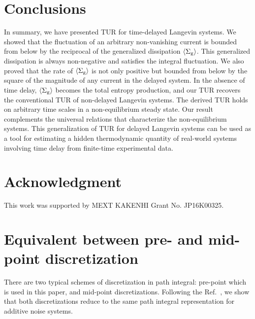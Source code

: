 \documentclass[pre,
twocolumn,
]{revtex4-1}
\theoremstyle{definition}
\theoremstyle{definition}
\newcommand{\avg}[1]{\langle #1\rangle}
\newcommand{\inl}[1]{$ #1 $}
\begin{document}
\section{Conclusions}\label{sect.Conclusion}
In summary, we have presented TUR for time-delayed Langevin systems.
We showed that the fluctuation of an arbitrary non-vanishing current is bounded from below by the reciprocal of the generalized dissipation \inl{\avg{\Sigma_{\rm g}}}.
This generalized dissipation is always non-negative and satisfies the integral fluctuation.
We also proved that the rate of \inl{\avg{\Sigma_{\rm g}}} is not only positive but bounded from below by the square of the magnitude of any current in the delayed system.
In the absence of time delay, \inl{\avg{\Sigma_{\rm g}}} becomes the total entropy production, and our TUR recovers the conventional TUR of non-delayed Langevin systems.
The derived TUR holds on arbitrary time scales in a non-equilibrium steady state.
Our result complements the universal relations that characterize the non-equilibrium systems.
This generalization of TUR for delayed Langevin systems can be used as a tool for estimating a hidden thermodynamic quantity of real-world systems involving time delay from finite-time experimental data.


\section*{Acknowledgment}
This work was supported by MEXT KAKENHI Grant No. JP16K00325.

\appendix
\section{Equivalent between pre- and mid-point discretization}\label{app.pat.int}
There are two typical schemes of discretization in path integral: pre-point which is used in this paper, and mid-point discretizations.
Following the Ref.~\cite{Adib.2008.JPCB}, we show that both discretizations reduce to the same path
integral representation for additive noise systems.
\end{document}
